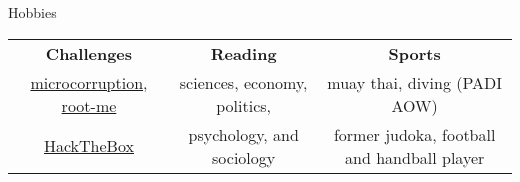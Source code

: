 \begin{rSection}{Hobbies}

  \begin{center}
      \begin{tabular}
          {c | c | c}
          \textbf{Challenges} & \textbf{Reading} & \textbf{Sports} \\
          \href{https://microcorruption.com/profile/43775}{microcorruption}, \href{http://www.root-me.org/Pamplemouss_?inc=score&lang=en}{root-me} & sciences, economy, politics, & muay thai, diving (PADI AOW) \\
          \href{https://www.hackthebox.eu/home/users/profile/204940}{HackTheBox} & psychology, and sociology & former judoka, football and handball player \\
      \end{tabular}
  \end{center}

\end{rSection}
